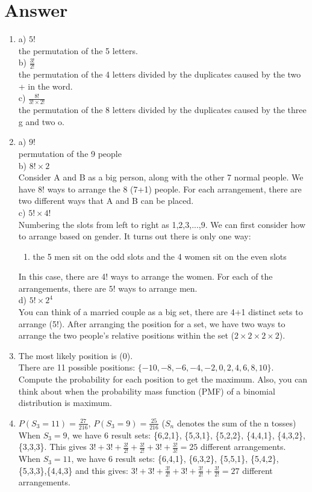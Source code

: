 \documentclass[11pt]{article}
\begin{document}
\section{Answer}
\begin{enumerate}
  \item a) $5!$ 
  \\ the permutation of the 5 letters.
  \\ b) $\frac{3!}{2!}$ 
  \\ the permutation of the 4 letters divided by the duplicates caused by the two + in the word.
  \\ c) $\frac{8!}{3! \times 2!}$ 
  \\ the permutation of the 8 letters divided by the duplicates caused by the three g and two o.
  \item a) $9!$ 
  \\ permutation of the 9 people  
  \\ b) $8! \times 2$ 
  \\Consider A and B as a big person, along with the other 7 normal people. We have $8!$ ways to arrange the 8 (7+1) people. For each arrangement, there are two different ways that A and B can be placed.
  \\ c) $ 5! \times 4!$ 
  \\ Numbering the slots from left to right as 1,2,3,...,9. 
  We can first consider how to arrange based on gender. 
  It turns out there is only one way: 
  \begin{enumerate}
    \item the 5 men sit on the odd slots and the 4 women sit on the even slots 
  \end{enumerate}
  In this case, there are 4! ways to arrange the women. For each of the arrangements, there are $5!$ ways to arrange men.
  \\ d) $5! \times 2^4$ 
  \\ You can think of a married couple as a big set, there are 4+1 distinct sets to arrange (5!). 
  After arranging the position for a set, we have two ways to arrange the two people's relative positions within the set ($2 \times 2 \times 2 \times 2$).
  \item The most likely position is (0).
  \\ There are 11 possible positions: $\{-10,-8,-6,-4,-2,0,2,4,6,8,10\}$. Compute the probability for each position to get the maximum. 
  Also, you can think about when the probability mass function (PMF) of a binomial distribution is maximum.
  \item $P(S_3=11) = \frac{27}{216}$, $P(S_3=9) = \frac{25}{216}$ ($S_n$ denotes the sum of the n tosses) 
  \\ When $S_3 = 9$, we have 6 result sets: \{6,2,1\}, \{5,3,1\}, \{5,2,2\}, \{4,4,1\}, \{4,3,2\}, \{3,3,3\}. This gives $3! + 3! + \frac{3!}{2!} + \frac{3!}{2!} + 3! + \frac{3!}{3!} = 25$ different arrangements.
  \\ When $S_3 = 11$, we have 6 result sets: \{6,4,1\}, \{6,3,2\}, \{5,5,1\}, \{5,4,2\}, \{5,3,3\},\{4,4,3\} and this gives: $3! + 3! + \frac{3!}{2!} + 3!  + \frac{3!}{2!}+ \frac{3!}{2!} = 27$ different arrangements.
\end{enumerate}
\end{document}
